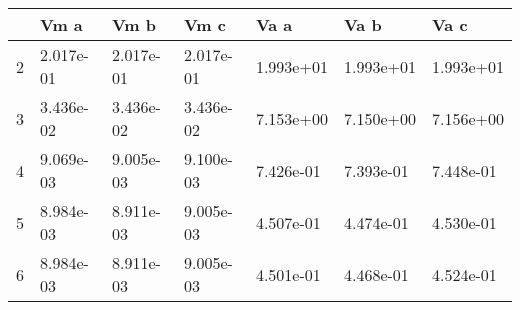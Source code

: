 \begin{tabular}{lllllll}
\toprule
{} &       Vm a &       Vm b &       Vm c &       Va a &       Va b &       Va c \\
\midrule
2 &  2.017e-01 &  2.017e-01 &  2.017e-01 &  1.993e+01 &  1.993e+01 &  1.993e+01 \\
3 &  3.436e-02 &  3.436e-02 &  3.436e-02 &  7.153e+00 &  7.150e+00 &  7.156e+00 \\
4 &  9.069e-03 &  9.005e-03 &  9.100e-03 &  7.426e-01 &  7.393e-01 &  7.448e-01 \\
5 &  8.984e-03 &  8.911e-03 &  9.005e-03 &  4.507e-01 &  4.474e-01 &  4.530e-01 \\
6 &  8.984e-03 &  8.911e-03 &  9.005e-03 &  4.501e-01 &  4.468e-01 &  4.524e-01 \\
\bottomrule
\end{tabular}
